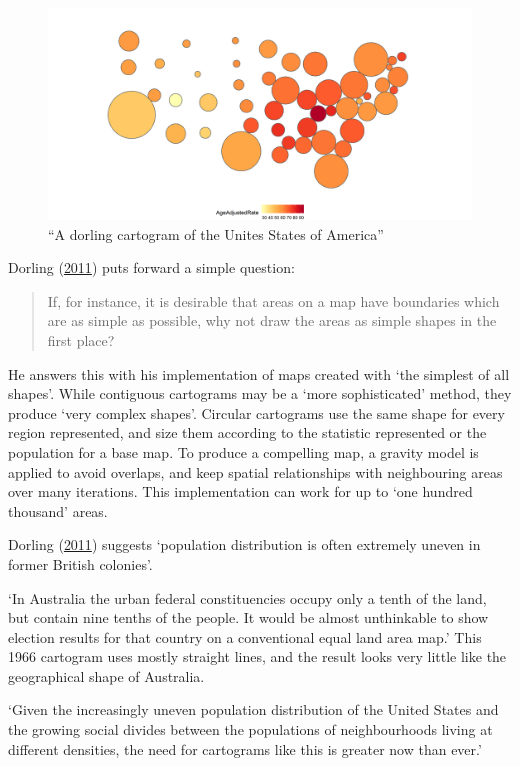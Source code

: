 \documentclass[11pt,]{article}
\begin{document}
\begin{figure}
\centering
\includegraphics{figures/ggdorl.png}
\caption{``A dorling cartogram of the Unites States of America''}
\end{figure}

Dorling (\protect\hyperlink{ref-ACTUC}{2011}) puts forward a simple
question:

\begin{quote}
If, for instance, it is desirable that areas on a map have boundaries
which are as simple as possible, why not draw the areas as simple shapes
in the first place?
\end{quote}

He answers this with his implementation of maps created with `the
simplest of all shapes'. While contiguous cartograms may be a `more
sophisticated' method, they produce `very complex shapes'. Circular
cartograms use the same shape for every region represented, and size
them according to the statistic represented or the population for a base
map. To produce a compelling map, a gravity model is applied to avoid
overlaps, and keep spatial relationships with neighbouring areas over
many iterations. This implementation can work for up to `one hundred
thousand' areas.

Dorling (\protect\hyperlink{ref-ACTUC}{2011}) suggests `population
distribution is often extremely uneven in former British colonies'.

`In Australia the urban federal constituencies occupy only a tenth of
the land, but contain nine tenths of the people. It would be almost
unthinkable to show election results for that country on a conventional
equal land area map.' This 1966 cartogram uses mostly straight lines,
and the result looks very little like the geographical shape of
Australia.

`Given the increasingly uneven population distribution of the United
States and the growing social divides between the populations of
neighbourhoods living at different densities, the need for cartograms
like this is greater now than ever.'
\end{document}
